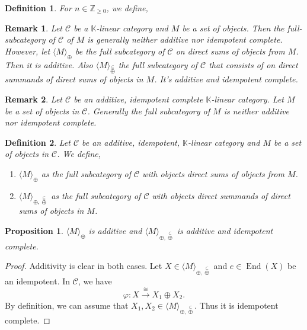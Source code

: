 \documentclass{article}
\newtheorem{proposition}{Proposition}[section]
\newtheorem{definition}{Definition}[section]
\newtheorem{remark}{Remark}[section]
\numberwithin{equation}{theorem}
\DeclareMathOperator{\End}{End}
\newcommand{\Z}[0]{\mathbb{Z}}
\newcommand{\K}[0]{\mathbb{K}}
\newcommand{\cat}[0]{\mathscr{C}}
\newcommand{\summand}[0]{\stackrel{\subseteq}{\oplus}}
\begin{document}
\begin{definition}
    For $n\in\Z_{\geq0}$, we define,
\end{definition}
\begin{remark}
  Let $\cat$ be a $\K$-linear category and $M$ be a set of objects. Then the full-subcategory of $\cat$ of $M$ is generally neither additive nor idempotent complete.
  However, let $\langle M\rangle_{\oplus}$ be the full subcategory of $\cat$ on direct sums of objects from $M$. Then it is additive. Also $\langle M\rangle_{\stackrel{\subseteq}{\oplus}}$ the full subcategory of $\cat$ that 
  consists of on direct summands of direct sums of objects in $M$. It's additive and idempotent complete.
\end{remark}

\begin{remark}
    Let $\cat$ be an additive, idempotent complete $\K$-linear category. Let $M$ be a set of objects in $\cat$. Generally the full subcategory of $M$ is neither additive nor idempotent complete.
\end{remark}

\begin{definition}
    Let $\cat$ be an additive, idempotent, $\K$-linear category and $M$ be a set of objects in $\cat$. We define,
    \begin{enumerate}[1).]
        \item $\langle M\rangle_{\oplus}$ as the full subcategory of $\cat$ with objects direct sums of objects from $M$.
        \item $\langle M\rangle_{\oplus,\summand}$ as the full subcategory of $\cat$ with objects direct summands of direct sums of objects in $M$.
    \end{enumerate}
\end{definition}

\begin{proposition}
    $\langle M\rangle_\oplus$ is additive and $\langle M\rangle_{\oplus,\summand}$ is additive and idempotent complete.
\end{proposition}

\begin{proof}
    Additivity is clear in both cases. Let $X\in\langle M\rangle_{\oplus,\summand}$ and $e\in\End(X)$ be an idempotent. In $\cat$, we have 
    \begin{equation*}
        \varphi:X\stackrel{\cong}{\to} X_1\oplus X_2.
    \end{equation*}
    By definition, we can assume that $X_1,X_2\in\langle M\rangle_{\oplus,\summand}$. Thus it is idempotent complete.
\end{proof}
\end{document}
